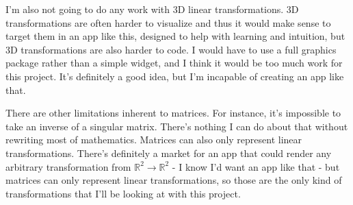 \documentclass[../main.tex]{subfiles}
\begin{document}
I'm also not going to do any work with 3D linear transformations. 3D transformations are often harder to visualize and thus it would make sense to target them in an app like this, designed to help with learning and intuition, but 3D transformations are also harder to code. I would have to use a full graphics package rather than a simple widget, and I think it would be too much work for this project. It's definitely a good idea, but I'm incapable of creating an app like that.

There are other limitations inherent to matrices. For instance, it's impossible to take an inverse of a singular matrix. There's nothing I can do about that without rewriting most of mathematics. Matrices can also only represent linear transformations. There's definitely a market for an app that could render any arbitrary transformation from $\mathbb{R}^2 \to \mathbb{R}^2$ - I know I'd want an app like that - but matrices can only represent linear transformations, so those are the only kind of transformations that I'll be looking at with this project.
\end{document}
